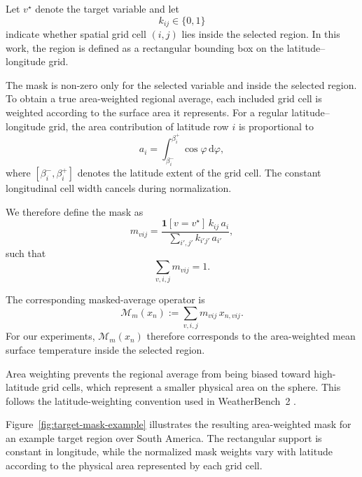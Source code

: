 Let \(v^\star\) denote the target variable and let
\[
    k_{ij}\in\{0,1\}
\]
indicate whether spatial grid cell \((i,j)\) lies inside the selected region.
In this work, the region is defined as a rectangular bounding box on the
latitude--longitude grid.

The mask is non-zero only for the selected variable and inside the selected
region.
To obtain a true area-weighted regional average, each included grid cell is
weighted according to the surface area it represents.
For a regular latitude--longitude grid, the area contribution of latitude row
\(i\) is proportional to
\begin{equation}
    a_i
    =
    \int_{\beta_i^-}^{\beta_i^+}
    \cos\varphi\,\mathrm{d}\varphi,
    \label{eq:mask-cell-area}
\end{equation}
where \([\beta_i^-,\beta_i^+]\) denotes the latitude extent of the grid cell.
The constant longitudinal cell width cancels during normalization.

We therefore define the mask as
\begin{equation}
    m_{vij}
    =
    \frac{
        \mathbf{1}[v=v^\star]\,
        k_{ij}\,a_i
    }{
        \displaystyle
        \sum_{i',j'}
        k_{i'j'}\,a_{i'}
    },
    \label{eq:target-mask}
\end{equation}
such that
\[
    \sum_{v,i,j}m_{vij}=1.
\]

The corresponding masked-average operator is
\begin{equation}
    \mathcal{M}_m(x_n)
    :=
    \sum_{v,i,j}
    m_{vij}\,x_{n,vij}.
    \label{eq:masked-average}
\end{equation}
For our experiments, \(\mathcal{M}_m(x_n)\) therefore corresponds to the
area-weighted mean surface temperature inside the selected region.

Area weighting prevents the regional average from being biased toward
high-latitude grid cells, which represent a smaller physical area on the
sphere.
This follows the latitude-weighting convention used in WeatherBench~2
\parencite{rasp2024weatherbench2}.

Figure~\ref{fig:target-mask-example} illustrates the resulting area-weighted
mask for an example target region over South America. The rectangular support
is constant in longitude, while the normalized mask weights vary with latitude
according to the physical area represented by each grid cell.

